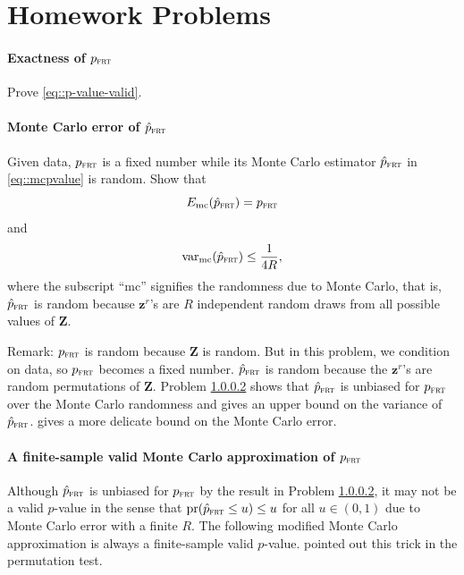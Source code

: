 \section{Homework Problems}



\paragraph{Exactness of $p_{\textsc{frt}}$}
\label{hw::exact-frt}

Prove \eqref{eq::p-value-valid}. 



\paragraph{Monte Carlo error of $\hat p_{\textsc{frt}}$ }\label{para::monte-carlo-error-pfrt}

Given data, $p_{\textsc{frt}}$ is a fixed number while its Monte Carlo estimator $\hat p_{\textsc{frt}}$ in \eqref{eq::mcpvalue} is random. 
Show that
$$
E_{\text{mc}} (\hat p_{\textsc{frt}}) =   p_{\textsc{frt}}
$$
and
$$
\textup{var}_{\text{mc}} (\hat p_{\textsc{frt}})  \leq \frac{1}{4R},
$$
where the subscript ``mc'' signifies the randomness due to Monte Carlo, that is, $\hat p_{\textsc{frt}}$ is random because $\bm{z}^r$'s are $R$ independent random draws from all possible values of $\bm{Z}$.


Remark: $p_{\textsc{frt}}$ is random because $\bm{Z}$ is random. But in this problem, we condition on data, so $p_{\textsc{frt}}$ becomes a fixed number. $\hat p_{\textsc{frt}}$ is random because the $\bm{z}^r$'s are random permutations of $\bm{Z}$.
Problem \ref{para::monte-carlo-error-pfrt} shows that $\hat p_{\textsc{frt}}$ is unbiased for $p_{\textsc{frt}}$ over the Monte Carlo randomness and gives an upper bound on the variance of $\hat p_{\textsc{frt}}$. \citet[][Theorem 2]{luo2021leveraging} gives a more delicate bound on the Monte Carlo error.




\paragraph{A finite-sample valid Monte Carlo approximation of $p_{\textsc{frt}}$ }\label{para::finite-sample-exact-monte-carlo-frt}


Although $\hat p_{\textsc{frt}}$ is unbiased for $p_{\textsc{frt}}$ by the result in Problem \ref{para::monte-carlo-error-pfrt}, it may not be a valid $p$-value in the sense that $\textup{pr}(\hat p_{\textsc{frt}} \leq u) \leq u$ for all $u\in (0,1)$ due to Monte Carlo error with a finite $R$. The following modified Monte Carlo approximation is always a finite-sample valid $p$-value. \citet{phipson2010permutation} pointed out this trick in the permutation test.



